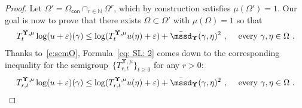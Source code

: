 \documentclass[11pt,letterpaper]{amsart}
\newcommand{\sem}[1]{\{#1\}_{t \ge 0}}
\newcommand{\N}{{\mathbb N}}
\newcommand{\comma}{\,\,\mathrm{,}\;\,}
\newcommand{\fstop}{\,\,\mathrm{.}}
\newcommand{\QP}{{\mu}}
\newcommand{\e}{\varepsilon}
\newcommand{\dUpsilon}{{\mathbf \Upsilon}}
\newcommand{\U}{\dUpsilon}
\renewcommand{\1}{\mathbf 1}
\numberwithin{equation}{section}
\theoremstyle{plain}
\theoremstyle{definition}
\theoremstyle{remark}
\begin{document}
\begin{proof}
Let $\Omega'=\Omega_{\mathsf{con}}\cap_{r\in \N}\Omega^r$, which by construction satisfies $\mu(\Omega')=1$. Our goal is now to prove that there exists $\Omega \subset \Omega'$ with $\QP(\Omega)=1$ so that 
\begin{align} \label{eq: SL: 2}
T^{\U, \QP}_{t}\log (u+\e)(\gamma) \le \log (T^{\U, \QP}_{t}u(\eta)+\e) + \bar{\mssd}_\U(\gamma, \eta)^2\comma \quad \text{every $\gamma, \eta \in \Omega$} \fstop
\end{align}
Thanks to~\eqref{e:semO}, Formula~\eqref{eq: SL: 2} comes down to the corresponding inequality for the semigroup~$\sem{T^{\U, \QP}_{r, t}}$ for any $r>0$:
\begin{align} \label{eq: SL: 3}
T^{\U, \QP}_{r, t}\log (u+\e)(\gamma) \le \log (T^{\U, \QP}_{r, t}u(\eta)+\e) + \bar{\mssd}_\U(\gamma, \eta)^2\comma \quad \text{every $\gamma, \eta \in \Omega$} \fstop
\end{align}


\end{proof}
\end{document}
